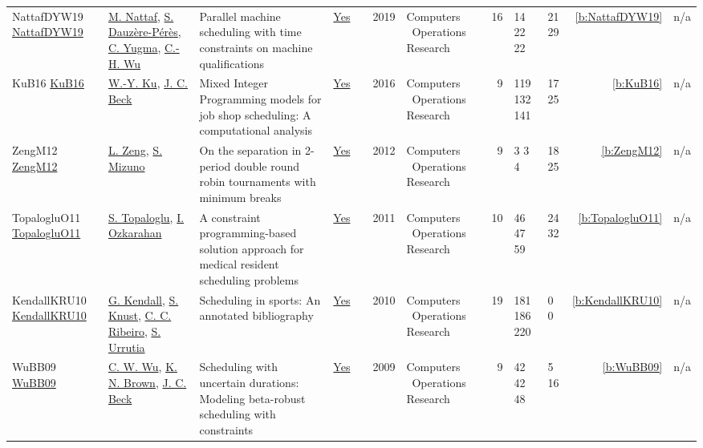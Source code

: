 {\begin{longtable}{>{\raggedright\arraybackslash}p{3cm}>{\raggedright\arraybackslash}p{4.5cm}>{\raggedright\arraybackslash}p{6.0cm}rrrp{2.5cm}rp{1cm}p{1cm}rr}
NattafDYW19 \href{https://doi.org/10.1016/j.cor.2019.03.004}{NattafDYW19} & \hyperref[auth:a81]{M. Nattaf}, \hyperref[auth:a994]{S. Dauz{\`{e}}re-P{\'{e}}r{\`{e}}s}, \hyperref[auth:a995]{C. Yugma}, \hyperref[auth:a996]{C.-H. Wu} & \cellcolor{gold!20}Parallel machine scheduling with time constraints on machine qualifications & \href{../works/NattafDYW19.pdf}{Yes} & \cite{NattafDYW19} & 2019 & Computers \  Operations Research & 16 & 14 22 22 & 21 29 & \ref{b:NattafDYW19} & n/a\\
KuB16 \href{https://doi.org/10.1016/j.cor.2016.04.006}{KuB16} & \hyperref[auth:a331]{W.-Y. Ku}, \hyperref[auth:a89]{J. C. Beck} & \cellcolor{green!10}Mixed Integer Programming models for job shop scheduling: {A} computational analysis & \href{../works/KuB16.pdf}{Yes} & \cite{KuB16} & 2016 & Computers \  Operations Research & 9 & 119 132 141 & 17 25 & \ref{b:KuB16} & n/a\\
ZengM12 \href{http://dx.doi.org/10.1016/j.cor.2011.10.004}{ZengM12} & \hyperref[auth:a1405]{L. Zeng}, \hyperref[auth:a1406]{S. Mizuno} & On the separation in 2-period double round robin tournaments with minimum breaks & \href{../works/ZengM12.pdf}{Yes} & \cite{ZengM12} & 2012 & Computers \  Operations Research & 9 & 3 3 4 & 18 25 & \ref{b:ZengM12} & n/a\\
TopalogluO11 \href{https://doi.org/10.1016/j.cor.2010.04.018}{TopalogluO11} & \hyperref[auth:a617]{S. Topaloglu}, \hyperref[auth:a348]{I. Ozkarahan} & A constraint programming-based solution approach for medical resident scheduling problems & \href{../works/TopalogluO11.pdf}{Yes} & \cite{TopalogluO11} & 2011 & Computers \  Operations Research & 10 & 46 47 59 & 24 32 & \ref{b:TopalogluO11} & n/a\\
KendallKRU10 \href{http://dx.doi.org/10.1016/j.cor.2009.05.013}{KendallKRU10} & \hyperref[auth:a1388]{G. Kendall}, \hyperref[auth:a1167]{S. Knust}, \hyperref[auth:a1387]{C. C. Ribeiro}, \hyperref[auth:a1389]{S. Urrutia} & Scheduling in sports: An annotated bibliography & \href{../works/KendallKRU10.pdf}{Yes} & \cite{KendallKRU10} & 2010 & Computers \  Operations Research & 19 & 181 186 220 & 0 0 & \ref{b:KendallKRU10} & n/a\\
WuBB09 \href{https://doi.org/10.1016/j.cor.2008.08.008}{WuBB09} & \hyperref[auth:a274]{C. W. Wu}, \hyperref[auth:a217]{K. N. Brown}, \hyperref[auth:a89]{J. C. Beck} & Scheduling with uncertain durations: Modeling beta-robust scheduling with constraints & \href{../works/WuBB09.pdf}{Yes} & \cite{WuBB09} & 2009 & Computers \  Operations Research & 9 & 42 42 48 & 5 16 & \ref{b:WuBB09} & n/a\\

\end{longtable}}
